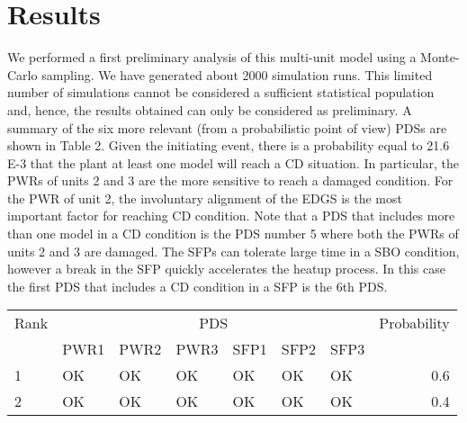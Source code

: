 \section{Results}
\label{sec:results}

We performed a first preliminary analysis of this multi-unit model using a Monte-Carlo sampling. 
We have generated about 2000 simulation runs.  This limited number of simulations cannot be considered 
a sufficient statistical population and, hence, the results obtained can only be considered as preliminary.
A summary of the six more relevant (from a probabilistic point of view) PDSs are shown in Table 2. 
Given the initiating event, there is a probability equal to 21.6 E-3 that the plant at least one model 
will reach a CD situation. In particular, the PWRs of units 2 and 3 are the more sensitive to reach a 
damaged condition. For the PWR of unit 2, the involuntary alignment of the EDGS is the most important 
factor for reaching CD condition.
Note that a PDS that includes more than one model in a CD condition is the PDS number 5 where both the 
PWRs of units 2 and 3 are damaged.
The SFPs can tolerate large time in a SBO condition, however a break in the SFP quickly accelerates 
the heatup process. In this case the first PDS that includes a CD condition in a SFP is the 6th PDS.

\begin{tabular}{lllllllr}
\hline
Rank & \multicolumn{6}{c}{PDS} & Probability           \\
\cline{2-7}
     & PWR1 & PWR2 & PWR3 & SFP1 & SFP2 & SFP3 &       \\
\hline
 1   & OK   & OK   & OK   & OK   & OK   & OK   & 0.6   \\
 2   & OK   & OK   & OK   & OK   & OK   & OK   & 0.4   \\
\hline
\end{tabular}
